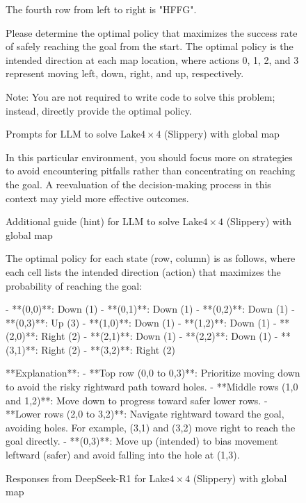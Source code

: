 \documentclass{article}
\begin{document}
\begin{figure}
\begin{mdframed}[roundcorner=10pt]
The fourth row from left to right is "HFFG".

Please determine the optimal policy that maximizes the success rate of safely reaching the goal from the start. The optimal policy is the intended direction at each map location, where actions 0, 1, 2, and 3 represent moving left, down, right, and up, respectively.

Note: You are not required to write code to solve this problem; instead, directly provide the optimal policy.
\end{mdframed}
\caption{Prompts for LLM to solve Lake$4\times4$ (Slippery) with global map}
\label{page:prompts_with_map}
\end{figure}

\begin{figure}
\begin{mdframed}[roundcorner=10pt]
In this particular environment, you should focus more on strategies to avoid encountering pitfalls rather than concentrating on reaching the goal. A reevaluation of the decision-making process in this context may yield more effective outcomes.
\end{mdframed}
\caption{Additional guide (hint) for LLM to solve Lake$4\times4$ (Slippery) with global map}
\label{page:prompts_hint}
\end{figure}

\begin{figure}
\begin{mdframed}[roundcorner=10pt]
The optimal policy for each state (row, column) is as follows, where each cell lists the intended direction (action) that maximizes the probability of reaching the goal:

- **(0,0)**: Down (1)
- **(0,1)**: Down (1)
- **(0,2)**: Down (1)
- **(0,3)**: Up (3)
- **(1,0)**: Down (1)
- **(1,2)**: Down (1)
- **(2,0)**: Right (2)
- **(2,1)**: Down (1)
- **(2,2)**: Down (1)
- **(3,1)**: Right (2)
- **(3,2)**: Right (2)

**Explanation**:
- **Top row (0,0 to 0,3)**: Prioritize moving down to avoid the risky rightward path toward holes.
- **Middle rows (1,0 and 1,2)**: Move down to progress toward safer lower rows.
- **Lower rows (2,0 to 3,2)**: Navigate rightward toward the goal, avoiding holes. For example, (3,1) and (3,2) move right to reach the goal directly.
- **(0,3)**: Move up (intended) to bias movement leftward (safer) and avoid falling into the hole at (1,3).
\end{mdframed}
\caption{Responses from DeepSeek-R1 for Lake$4\times4$ (Slippery) with global map}
\label{page:results_ds_w_hint}
\end{figure}
\end{document}
